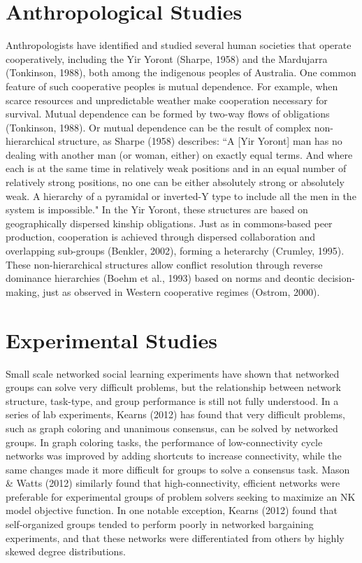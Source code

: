 \section{Anthropological Studies}
Anthropologists have identified and studied several human societies that operate cooperatively, including the Yir Yoront (Sharpe, 1958) and the Mardujarra (Tonkinson, 1988), both among the indigenous peoples of Australia. One common feature of such cooperative peoples is mutual dependence. For example, when scarce resources and unpredictable weather make cooperation necessary for survival. Mutual dependence can be formed by two-way flows of obligations (Tonkinson, 1988). Or mutual dependence can be the result of complex non-hierarchical structure, as Sharpe (1958) describes: “A [Yir Yoront] man has no dealing with another man (or woman, either) on exactly equal terms. And where each is at the same time in relatively weak positions and in an equal number of relatively strong positions, no one can be either absolutely strong or absolutely weak. A hierarchy of a pyramidal or inverted-Y type to include all the men in the system is impossible." In the Yir Yoront, these structures are based on geographically dispersed kinship obligations. Just as in commons-based peer production, cooperation is achieved through dispersed collaboration and overlapping sub-groups (Benkler, 2002), forming a heterarchy (Crumley, 1995). These non-hierarchical structures allow conflict resolution through reverse dominance hierarchies (Boehm et al., 1993) based on norms and deontic decision-making, just as observed in Western cooperative regimes (Ostrom, 2000).

\section{Experimental Studies}
Small scale networked social learning experiments have shown that networked groups can solve very difficult problems, but the relationship between network structure, task-type, and group performance is still not fully understood. In a series of lab experiments, Kearns (2012) has found that very difficult problems, such as graph coloring and unanimous consensus, can be solved by networked groups. In graph coloring tasks, the performance of low-connectivity cycle networks was improved by adding shortcuts to increase connectivity, while the same changes made it more difficult for groups to solve a consensus task. Mason \& Watts (2012) similarly found that high-connectivity, efficient networks were preferable for experimental groups of problem solvers seeking to maximize an NK model objective function. In one notable exception, Kearns (2012) found that self-organized groups tended to perform poorly in networked bargaining experiments, and that these networks were differentiated from others by highly skewed degree distributions.

